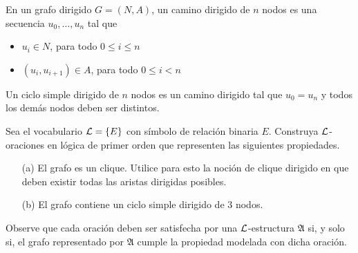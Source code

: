 En un grafo dirigido $G=(N,A)$, un camino dirigido de $n$ nodos es una secuencia $u_0,\ldots,u_n$ tal que
\begin{itemize}
    \item $u_i\in N$, para todo $0\leq i\leq n$
    \item $(u_i,u_{i+1})\in A$, para todo $0\leq i < n$
\end{itemize}
Un ciclo simple dirigido de $n$ nodos es un camino dirigido tal que $u_0=u_n$ y todos los demás nodos deben ser distintos.\medskip

Sea el vocabulario $\mathcal{L}=\{E\}$ con símbolo de relación binaria $E$. Construya $\mathcal{L}$-oraciones en lógica de primer orden que representen las siguientes propiedades. 
\begin{enumerate}
    \item[(a)] El grafo es un clique. Utilice para esto la noción de clique dirigido en que deben existir todas las aristas dirigidas posibles.
    \item[(b)] El grafo contiene un ciclo simple dirigido de 3 nodos.
\end{enumerate}
Observe que cada oración deben ser satisfecha por una $\mathcal{L}$-estructura $\mathfrak{A}$ si, y solo si, el grafo representado por $\mathfrak{A}$ cumple la propiedad modelada con dicha oración.